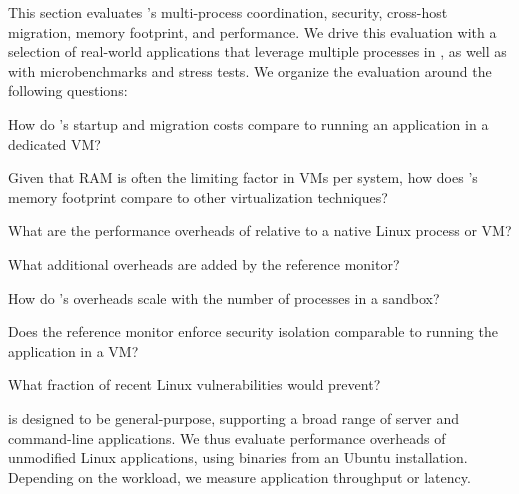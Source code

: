 This section evaluates \graphene{}'s multi-process coordination, security, cross-host migration, memory footprint, and performance.
We drive this evaluation with a selection of real-world applications that leverage multiple processes in \graphene{},
as well as with microbenchmarks and stress tests.
We organize the evaluation around the following questions:
\begin{compactenum}
	\item How do \graphene{}'s startup and migration costs compare to running an application in a dedicated VM?
	\item Given that RAM is often the limiting factor in VMs per system, how does \graphene{}'s memory footprint compare to other virtualization techniques?
	\item What are the performance overheads of \graphene{} relative to a native Linux process or VM?
	\item What additional overheads are added by the reference monitor?
	\item How do \graphene{}'s overheads scale with the number of processes in a sandbox?
	\item Does the \graphene{} reference monitor enforce security isolation comparable to running the application in a VM?  
	\item What fraction of recent Linux vulnerabilities would \graphene{} prevent?
\end{compactenum}




\graphenesgx{} is designed to be general-purpose, supporting a broad range of
server and command-line applications. 
We thus evaluate performance overheads of unmodified Linux applications, using binaries 
from an Ubuntu installation.
Depending on the workload, we measure application throughput or latency.

